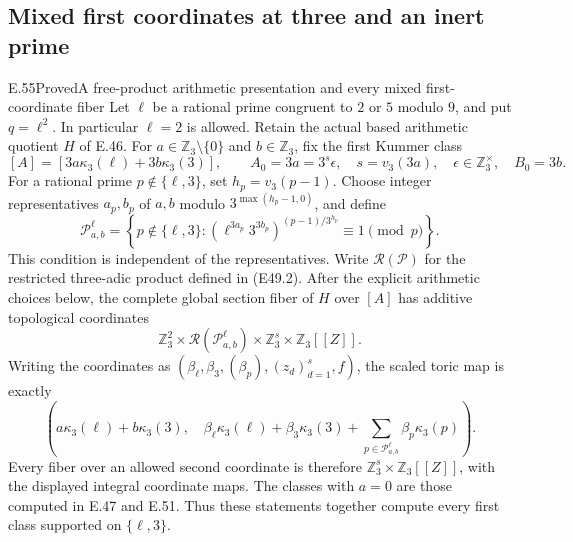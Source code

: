 \subsection{Mixed first coordinates at three and an inert prime}

\begin{statement}{E.55}{Proved}{A free-product arithmetic presentation and every mixed first-coordinate fiber}
Let $\ell$ be a rational prime congruent to $2$ or $5$ modulo
$9$, and put $q=\ell^2$. In particular $\ell=2$ is allowed.
Retain the actual based arithmetic quotient $H$ of E.46.
For $a\in\mathbb Z_3\setminus\{0\}$ and $b\in\mathbb Z_3$,
fix the first Kummer class
\[
 [A]=[3a\kappa_3(\ell)+3b\kappa_3(3)],\qquad
 A_0=3a=3^s\epsilon,\quad s=v_3(3a),\quad
 \epsilon\in\mathbb Z_3^\times,\quad B_0=3b.
 \tag{E55.1}
\]
For a rational prime $p\notin\{\ell,3\}$, set $h_p=v_3(p-1)$.
Choose integer representatives $a_p,b_p$ of $a,b$ modulo
$3^{\max(h_p-1,0)}$, and define
\[
 \mathscr P_{a,b}^{\ell}=
 \left\{p\notin\{\ell,3\}:
 \left(\ell^{3a_p}3^{3b_p}\right)^{(p-1)/3^{h_p}}
                         \equiv1\pmod p\right\}.
 \tag{E55.2}
\]
This condition is independent of the representatives. Write
$\mathcal R(\mathscr P)$ for the restricted three-adic product
defined in (E49.2). After the explicit arithmetic choices below,
the complete global section fiber of $H$ over $[A]$ has additive
topological coordinates
\[
 \boxed{\quad
 \mathbb Z_3^2\times\mathcal R(\mathscr P_{a,b}^{\ell})
                    \times\mathbb Z_3^s\times\mathbb Z_3[[Z]].
 \quad}                                                     \tag{E55.3}
\]
Writing the coordinates as
$(\beta_\ell,\beta_3,(\beta_p),(z_d)_{d=1}^s,f)$,
the scaled toric map is exactly
\[
 \left(a\kappa_3(\ell)+b\kappa_3(3),\quad
 \beta_\ell\kappa_3(\ell)+\beta_3\kappa_3(3)
                +\sum_{p\in\mathscr P_{a,b}^{\ell}}
                                      \beta_p\kappa_3(p)\right).
 \tag{E55.4}
\]
Every fiber over an allowed second coordinate is therefore
$\mathbb Z_3^s\times\mathbb Z_3[[Z]]$, with the displayed
integral coordinate maps. The classes with $a=0$ are those
computed in E.47 and E.51. Thus these statements together
compute every first class supported on $\{\ell,3\}$.


\end{statement}
